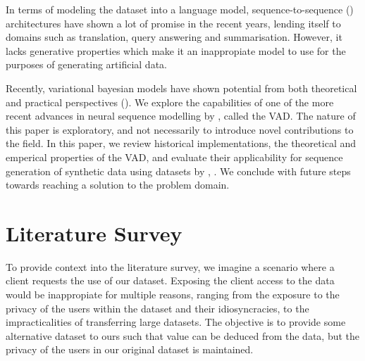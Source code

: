 \documentclass[12pt,twoside]{report}
\begin{document}
In terms of modeling the dataset into a language model, sequence-to-sequence (\cite{serban_hierarchical_2016}) architectures have shown a lot of promise in the recent years, lending itself to domains such as translation, query answering and summarisation. However, it lacks generative properties which make it an inappropiate model to use for the purposes of generating artificial data.

Recently, variational bayesian models have shown potential from both theoretical and practical perspectives (\cite{kingma_auto-encoding_2013}). We explore the capabilities of one of the more recent advances in neural sequence modelling by \cite{du_variational_2018}, called the VAD. 
The nature of this paper is exploratory, and not necessarily to introduce novel contributions to the field. In this paper, we review historical implementations, the theoretical and emperical properties of the VAD, and evaluate their applicability for sequence generation of synthetic data using  datasets by \cite{he_ups_2016}, \cite{lison_opensubtitles2016:_2016}. We conclude with future steps towards reaching a solution to the problem domain.




\chapter{Literature Survey}

To provide context into the literature survey, we imagine a scenario where a client requests the use of our dataset. Exposing the client access to the data would be inappropiate for multiple reasons, ranging from the exposure to the privacy of the users within the dataset and their idiosyncracies, to the impracticalities of transferring large datasets. The objective is to provide some alternative dataset to ours such that value can be deduced from the data, but the privacy of the users in our original dataset is maintained.
\end{document}
